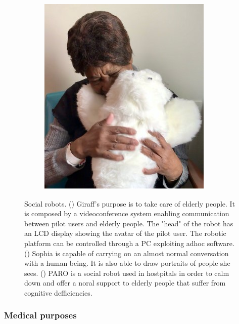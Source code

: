 \documentclass[runningheads,a4paper,12pt]{report}
\begin{document}
\begin{figure}
\begin{subfigure}{.4\textwidth}
  	\includegraphics[width=\linewidth]{./images/1_paro}\hfill
  	\caption{}
  	\label{fig:paro}
  \end{subfigure}\par\medskip
  
    \caption{Social robots. 
    () Giraff's purpose is to take care of elderly people. It is composed by a videoconference system enabling communication between pilot users and elderly people. The "head" of the robot has an LCD display showing the avatar of the pilot user. The robotic platform can be controlled through a PC exploiting ad­hoc software. \cite{giraff}
    () Sophia is capable of carrying on an almost normal conversation with a human being. It is also able to draw portraits of people she sees. \cite{sophia}  
    () PARO is a social robot used in hostpitals in order to calm down and offer a noral support to elderly people that suffer from cognitive defficiencies. \cite{paro} 
    }
    \label{fig:social-robots-fields}
\end{figure} 

\subsubsection{Medical purposes}
\end{document}
